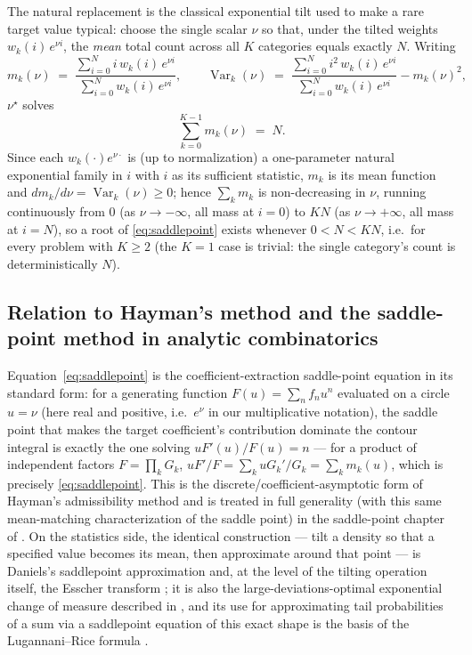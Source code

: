 \documentclass[11pt]{article}
\newcommand{\Var}{\operatorname{Var}}
\begin{document}
The natural replacement is the classical exponential tilt used to make a rare target
value typical: choose the single scalar $\nu$ so that, under the tilted weights
$w_k(i)\,e^{\nu i}$, the \emph{mean} total count across all $K$ categories equals
exactly $N$. Writing
\[
  m_k(\nu) \;=\; \frac{\displaystyle\sum_{i=0}^N i\, w_k(i)\, e^{\nu i}}
                     {\displaystyle\sum_{i=0}^N w_k(i)\, e^{\nu i}},
  \qquad
  \Var_k(\nu) \;=\; \frac{\displaystyle\sum_{i=0}^N i^2\, w_k(i)\, e^{\nu i}}
                          {\displaystyle\sum_{i=0}^N w_k(i)\, e^{\nu i}} - m_k(\nu)^2,
\]
$\nu^\star$ solves
\begin{equation}
  \label{eq:saddlepoint}
  \sum_{k=0}^{K-1} m_k(\nu) \;=\; N.
\end{equation}
Since each $w_k(\cdot)e^{\nu\cdot}$ is (up to normalization) a one-parameter natural
exponential family in $i$ with $i$ as its sufficient statistic, $m_k$ is its mean
function and $dm_k/d\nu = \Var_k(\nu) \ge 0$; hence $\sum_k m_k$ is non-decreasing in
$\nu$, running continuously from $0$ (as $\nu\to-\infty$, all mass at $i=0$) to $KN$
(as $\nu\to+\infty$, all mass at $i=N$), so a root of \eqref{eq:saddlepoint} exists
whenever $0 < N < KN$, i.e.\ for every problem with $K\ge 2$ (the $K=1$ case is trivial:
the single category's count is deterministically $N$).

\subsection{Relation to Hayman's method and the saddle-point method in analytic combinatorics}

Equation~\eqref{eq:saddlepoint} is the coefficient-extraction saddle-point equation in
its standard form: for a generating function $F(u) = \sum_n f_n u^n$ evaluated on a
circle $u = \nu$ (here real and positive, i.e.\ $e^{\nu}$ in our multiplicative
notation), the saddle point that makes the target coefficient's contribution dominate
the contour integral is exactly the one solving $u F'(u)/F(u) = n$ --- for a product of
independent factors $F=\prod_k G_k$, $uF'/F = \sum_k u G_k'/G_k = \sum_k m_k(u)$, which
is precisely \eqref{eq:saddlepoint}. This is the discrete/coefficient-asymptotic form of
Hayman's admissibility method \citep{hayman1956} and is treated in full generality (with
this same mean-matching characterization of the saddle point) in the saddle-point
chapter of \citet{flajolet2009}. On the statistics side, the identical construction ---
tilt a density so that a specified value becomes its mean, then approximate around that
point --- is Daniels's saddlepoint approximation \citep{daniels1954} and, at the level
of the tilting operation itself, the Esscher transform \citep{esscher1932}; it is also
the large-deviations-optimal exponential change of measure described in
\citet{dembozeitouni1998}, and its use for approximating tail probabilities of a sum via
a saddlepoint equation of this exact shape is the basis of the Lugannani--Rice formula
\citep{lugannanirice1980}.
\end{document}
